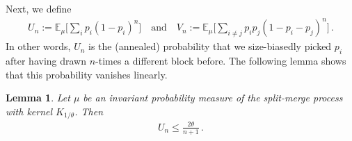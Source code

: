 \documentclass[a4paper,11pt]{article}
\newcommand{\EE}{\mathbb{E}}
\numberwithin{equation}{section}
\newtheorem{lemma}[theorem]{Lemma}
\begin{document}
Next, we define
\begin{equation*}
\begin{aligned}
U_{n} := \EE_{\mu}\bigg[ \sum_{i} p_{i} ( 1- p_{i})^{n} \bigg]
\quad \text{and} \quad 
V_{n} := \EE_{\mu}\bigg[ \sum_{i \neq j } p_{i} p_{j} ( 1- p_{i}- p_{j})^{n} \bigg]\,.
\end{aligned}
\end{equation*}
In other words, $ U_{n}$ is the (annealed) probability that we size-biasedly picked $ p_{i}$ after having drawn $n$-times a different block before.
The following lemma shows that this probability vanishes linearly.

\begin{lemma}\label{lem_U}
	Let $ \mu$ be an invariant probability measure of the split-merge process with kernel $ K_{1/ \theta} $.
Then 
\begin{equation*}
\begin{aligned}
	U_{n} \leq \frac{2 \theta }{n+1} \,.
\end{aligned}
\end{equation*}
\end{lemma}
\end{document}
